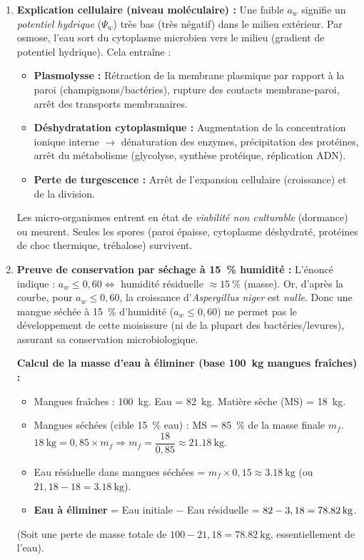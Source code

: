 \documentclass[11pt]{article}
\begin{document}
\begin{corrige}
\begin{enumerate}
\item \textbf{Explication cellulaire (niveau moléculaire) :}
Une faible $a_w$ signifie un \emph{potentiel hydrique} ($\Psi_w$) très bas (très négatif) dans le milieu extérieur. Par osmose, l'eau sort du cytoplasme microbien vers le milieu (gradient de potentiel hydrique). Cela entraîne :
\begin{itemize}
\item \textbf{Plasmolysse :} Rétraction de la membrane plasmique par rapport à la paroi (champignons/bactéries), rupture des contacts membrane-paroi, arrêt des transports membranaires.
\item \textbf{Déshydratation cytoplasmique :} Augmentation de la concentration ionique interne $\to$ dénaturation des enzymes, précipitation des protéines, arrêt du métabolisme (glycolyse, synthèse protéique, réplication ADN).
\item \textbf{Perte de turgescence :} Arrêt de l'expansion cellulaire (croissance) et de la division.
\end{itemize}
Les micro-organismes entrent en état de \emph{viabilité non culturable} (dormance) ou meurent. Seules les spores (paroi épaisse, cytoplasme déshydraté, protéines de choc thermique, tréhalose) survivent.

\item \textbf{Preuve de conservation par séchage à \SI{15}{\%} humidité :}
L'énoncé indique : $a_w \le 0,60 \Leftrightarrow$ humidité résiduelle $\approx \SI{15}{\%}$ (masse). Or, d'après la courbe, pour $a_w \le 0,60$, la croissance d'\emph{Aspergillus niger} est \emph{nulle}. Donc une mangue séchée à \SI{15}{\%} d'humidité ($a_w \le 0,60$) ne permet pas le développement de cette moisissure (ni de la plupart des bactéries/levures), assurant sa conservation microbiologique.

\textbf{Calcul de la masse d'eau à éliminer (base \SI{100}{\kg} mangues fraîches) :}
\begin{itemize}
\item Mangues fraîches : \SI{100}{\kg}. Eau = \SI{82}{\kg}. Matière sèche (MS) = \SI{18}{\kg}.
\item Mangues séchées (cible \SI{15}{\%} eau) : MS = \SI{85}{\%} de la masse finale $m_f$.
$\SI{18}{\kg} = 0,85 \times m_f \Rightarrow m_f = \dfrac{18}{0,85} \approx \SI{21,18}{\kg}$.
\item Eau résiduelle dans mangues séchées = $m_f \times 0,15 \approx \SI{3,18}{\kg}$ (ou $21,18 - 18 = \SI{3,18}{\kg}$).
\item \textbf{Eau à éliminer} = Eau initiale $-$ Eau résiduelle = $82 - 3,18 = \textbf{\SI{78,82}{\kg}}$.
\end{itemize}
(Soit une perte de masse totale de $100 - 21,18 = \SI{78,82}{\kg}$, essentiellement de l'eau).


\end{enumerate}
\end{corrige}
\end{document}
